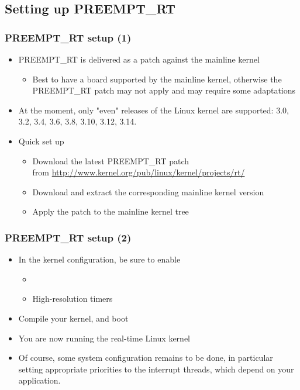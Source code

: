 \subsection{Setting up PREEMPT\_RT}

\begin{frame}
  \frametitle{PREEMPT\_RT setup (1)}
  \begin{itemize}
  \item PREEMPT\_RT is delivered as a patch against the mainline
    kernel
    \begin{itemize}
    \item Best to have a board supported by the mainline kernel,
      otherwise the PREEMPT\_RT patch may not apply and may require
      some adaptations
    \end{itemize}
  \item At the moment, only "even" releases of the Linux kernel are
    supported: 3.0, 3.2, 3.4, 3.6, 3.8, 3.10, 3.12, 3.14.
  \item Quick set up
    \begin{itemize}
    \item Download the latest PREEMPT\_RT patch\\
      from \footnotesize \url{http://www.kernel.org/pub/linux/kernel/projects/rt/} \normalsize
    \item Download and extract the corresponding mainline kernel
      version
    \item Apply the patch to the mainline kernel tree
    \end{itemize}
  \end{itemize}
\end{frame}

\begin{frame}
  \frametitle{PREEMPT\_RT setup (2)}
  \begin{itemize}
  \item In the kernel configuration, be sure to enable
    \begin{itemize}
    \item {}
    \item High-resolution timers
    \end{itemize}
  \item Compile your kernel, and boot
  \item You are now running the real-time Linux kernel
  \item Of course, some system configuration remains to be done, in
    particular setting appropriate priorities to the interrupt
    threads, which depend on your application.
  \end{itemize}
\end{frame}

